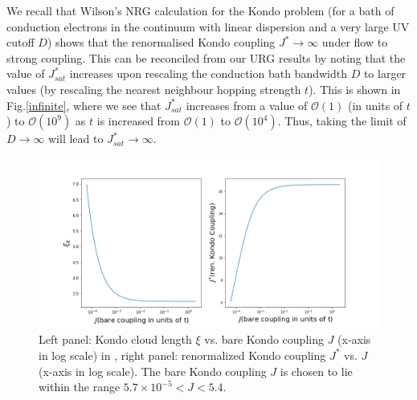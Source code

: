 \documentclass[aps,prb,preprint,groupedaddress]{revtex4-2}
\begin{document}
We recall that Wilson's NRG calculation for the Kondo problem (for a bath of conduction electrons in the continuum with linear dispersion and a very large UV cutoff $D$) shows that the renormalised Kondo coupling $J^{*}\to\infty$ under flow to strong coupling. This can be reconciled from our URG results by noting that the value of $J^{*}_{sat}$ increases upon rescaling the conduction bath bandwidth $D$ to larger values (by rescaling the nearest neighbour hopping strength $t$). This is shown in Fig.\ref{infinite}, where we see that $J^{*}_{sat}$ increases from a value of $\mathcal{O}(1)$ (in units of $t$) to $\mathcal{O}(10^{9})$ as $t$ is increased from $\mathcal{O}(1)$ to $\mathcal{O}(10^{4})$. Thus, taking the limit of $D\to\infty$ will lead to $J^{*}_{sat}\to\infty$. 
\begin{figure}[ht!]
\includegraphics[scale=0.5]{KondoComplete.png}
\caption{Left panel: Kondo cloud length $\xi$ vs. bare Kondo coupling $J$ (x-axis in log scale) in , right panel: renormalized Kondo coupling $J^{*}$ vs. $J$ (x-axis in log scale). The bare Kondo coupling $J$ is chosen to lie within the range $5.7\times 10^{-5}<J<5.4$.}\label{strong}
\end{figure}
\end{document}
